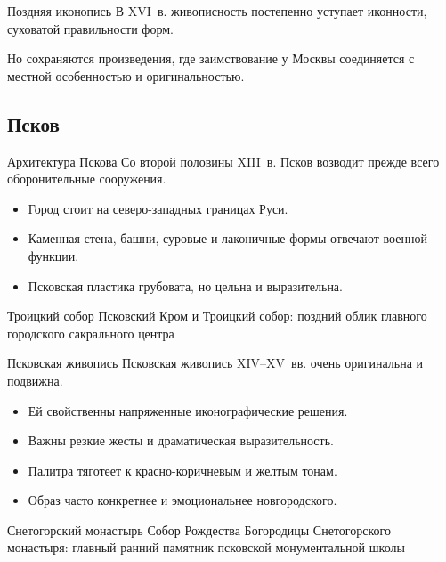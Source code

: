 \begin{frame}{Поздняя иконопись}
  В XVI~в. живописность постепенно уступает иконности,
  суховатой правильности форм.

  \vspace{0.8em}
  Но сохраняются произведения, где заимствование у Москвы
  соединяется с местной особенностью и оригинальностью.
\end{frame}

\subsection{Псков}

\begin{frame}{Архитектура Пскова}
  Со второй половины XIII~в. Псков возводит прежде всего
  оборонительные сооружения.

  \begin{itemize}
    \item Город стоит на северо-западных границах Руси.
    \item Каменная стена, башни, суровые и лаконичные формы
          отвечают военной функции.
    \item Псковская пластика грубовата, но цельна и выразительна.
  \end{itemize}
\end{frame}

\begin{frame}{Троицкий собор}
    {Псковский Кром и Троицкий собор:
     поздний облик главного городского сакрального центра}
\end{frame}

\begin{frame}{Псковская живопись}
  Псковская живопись XIV--XV~вв. очень оригинальна и подвижна.

  \begin{itemize}
    \item Ей свойственны напряженные иконографические решения.
    \item Важны резкие жесты и драматическая выразительность.
    \item Палитра тяготеет к красно-коричневым и желтым тонам.
    \item Образ часто конкретнее и эмоциональнее новгородского.
  \end{itemize}
\end{frame}

\begin{frame}{Снетогорский монастырь}
    {Собор Рождества Богородицы Снетогорского монастыря:
     главный ранний памятник псковской монументальной школы}
\end{frame}

